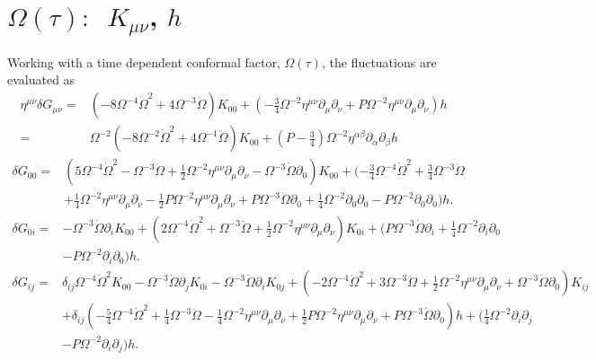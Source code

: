 \documentclass[10pt,letterpaper]{article}
\begin{document}
\section*{$\Omega(\tau):$\  $K_{\mu\nu}$, $h$}
Working with a time dependent conformal factor, $\Omega(\tau)$, the fluctuations are evaluated as 
\begin{align}
\eta^{\mu\nu}\delta G_{\mu\nu}={}&(-8 \Omega^{-4} \dot{\Omega}^2 + 4 \Omega^{-3} \ddot{\Omega}) K_{00} + (- \tfrac{3}{4} \Omega^{-2} \eta^{\mu \nu} \partial_{\mu} \partial_{\nu} + P \Omega^{-2} \eta^{\mu \nu} \partial_{\mu} \partial_{\nu}) h
 \nonumber \\
={}&\Omega^{-2}(-8 \Omega^{-2} \dot{\Omega}^2
 + 4 \Omega^{-1} \ddot{\Omega}) K_{00} +(P-\tfrac34) \Omega^{-2}\eta^{\alpha\beta}\partial_\alpha\partial_\beta h
\end{align}
\begin{align}
\delta G_{00}={}&(5 \Omega^{-4} \dot{\Omega}^2
 -  \Omega^{-3} \ddot{\Omega}
 + \tfrac{1}{2} \Omega^{-2} \eta^{\mu \nu} \partial_{\mu} \partial_{\nu}
 -  \Omega^{-3} \dot{\Omega} \partial_{0}) K_{00}
 + (- \tfrac{3}{4} \Omega^{-4} \dot{\Omega}^2
 + \tfrac{3}{4} \Omega^{-3} \ddot{\Omega}\nonumber\\
& + \tfrac{1}{4} \Omega^{-2} \eta^{\mu \nu} \partial_{\mu} \partial_{\nu}
 -  \tfrac{1}{2} P \Omega^{-2} \eta^{\mu \nu} \partial_{\mu} \partial_{\nu}
 + P \Omega^{-3} \dot{\Omega} \partial_{0}
 + \tfrac{1}{4} \Omega^{-2} \partial_{0} \partial_{0}
 -  P \Omega^{-2} \partial_{0} \partial_{0}) h.
\end{align}
\begin{align}
\delta G_{0i}={}&- \Omega^{-3} \dot{\Omega} \partial_{i} K_{00}
 + (2 \Omega^{-4} \dot{\Omega}^2
 + \Omega^{-3} \ddot{\Omega}
 + \tfrac{1}{2} \Omega^{-2} \eta^{\mu \nu} \partial_{\mu} \partial_{\nu}) K_{0i}
 + (P \Omega^{-3} \dot{\Omega} \partial_{i}
 + \tfrac{1}{4} \Omega^{-2} \partial_{i} \partial_{0}\nonumber\\
& -  P \Omega^{-2} \partial_{i} \partial_{0}) h.
\end{align}
\begin{align}
\delta G_{ij}={}&\delta_{ij}\Omega^{-4} \dot{\Omega}^2 K_{00}
 - \Omega^{-3} \dot{\Omega} \partial_{j} K_{0i}
 -  \Omega^{-3} \dot{\Omega} \partial_{i} K_{0j}
 + (-2 \Omega^{-4} \dot{\Omega}^2
 + 3 \Omega^{-3} \ddot{\Omega}
 + \tfrac{1}{2} \Omega^{-2} \eta^{\mu \nu} \partial_{\mu} \partial_{\nu}
 + \Omega^{-3} \dot{\Omega} \partial_{0}) K_{ij}\nonumber\\
& + \delta_{ij}(- \tfrac{5}{4} \Omega^{-4} \dot{\Omega}^2
 + \tfrac{1}{4} \Omega^{-3} \ddot{\Omega}
 -  \tfrac{1}{4} \Omega^{-2} \eta^{\mu \nu} \partial_{\mu} \partial_{\nu}
 + \tfrac{1}{2} P \Omega^{-2} \eta^{\mu \nu} \partial_{\mu} \partial_{\nu}
 + P \Omega^{-3} \dot{\Omega} \partial_{0})h
 + (\tfrac{1}{4} \Omega^{-2} \partial_{i} \partial_{j}\nonumber\\
& -  P \Omega^{-2} \partial_{i} \partial_{j}) h.
\end{align}
\end{document}
